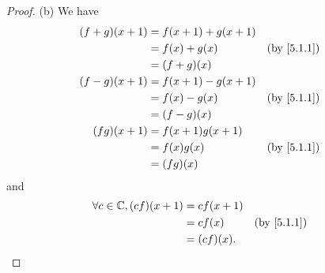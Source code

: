 \begin{proof}{(b)}
  We have
  \begin{align*}
    (f + g)(x + 1) & = f(x + 1) + g(x + 1)                 \\
                   & = f(x) + g(x)         &  & \by{5.1.1} \\
                   & = (f + g)(x)                          \\
    (f - g)(x + 1) & = f(x + 1) - g(x + 1)                 \\
                   & = f(x) - g(x)         &  & \by{5.1.1} \\
                   & = (f - g)(x)                          \\
    (f g)(x + 1)   & = f(x + 1) g(x + 1)                   \\
                   & = f(x) g(x)           &  & \by{5.1.1} \\
                   & = (f g)(x)
  \end{align*}
  and
  \begin{align*}
    \forall c \in \C, (c f)(x + 1) & = c f(x + 1)                 \\
                                   & = c f(x)     &  & \by{5.1.1} \\
                                   & = (c f)(x).
  \end{align*}
\end{proof}

